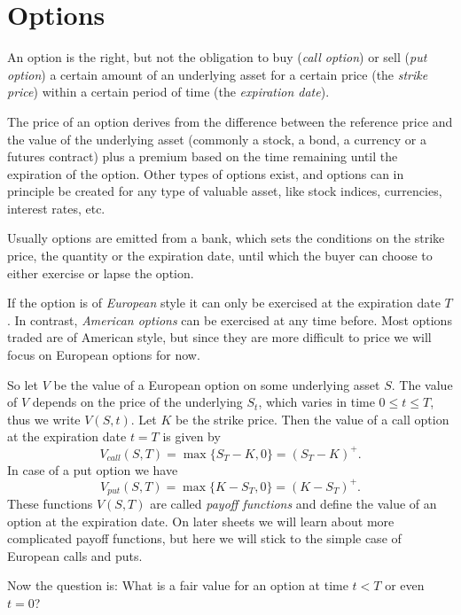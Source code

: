 \documentclass{scrartcl}
\begin{document}
	\section{Options}
	An option is the right, but not the obligation to buy (\textit{call option}) or sell (\textit{put option}) a certain amount of an underlying asset for a certain price (the \textit{strike price}) within a certain period of time (the \textit{expiration date}).\par
	The price of an option derives from the difference between the reference price and the value of the underlying asset (commonly a stock, a bond, a currency or a futures contract) plus a premium based on the time remaining until the expiration of the option. Other types of options exist, and options can in principle be created for any type of valuable asset, like stock indices, currencies, interest rates, etc.\par
	Usually options are emitted from a bank, which sets the conditions on the strike price, the quantity or the expiration date, until which the buyer can choose to either exercise or lapse the option.\par 
	If the option is of \textit{European} style it can only be exercised at the expiration date $T$. In contrast, \textit{American options} can be exercised at any time before. Most options traded are of American style, but since they are more difficult to price we will focus on European options for now.\par 
	So let $V$ be the value of a European option on some underlying asset $S$. The value of $V$ depends on the price of the underlying $S_t$, which varies in time $0\leq t\leq T$, thus we write $V(S,t)$. Let $K$ be the strike price. Then the value of a call option at the expiration date $t=T$ is given by
	\begin{equation}
		V_{call}(S, T) = \max\{S_T - K, 0\} = (S_T - K)^+ \text{.}
	\end{equation}
	In case of a put option we have
	\begin{equation}
		V_{put}(S, T) = \max\{K - S_T, 0\} = (K - S_T)^+ \text{.}
	\end{equation}
	These functions $V(S, T)$ are called \textit{payoff functions} and define the value of an option at the expiration date. On later sheets we will learn about more complicated payoff functions, but here we will stick to the simple case of European calls and puts.\par
	Now the question is: What is a fair value for an option at time $t < T$ or even $t = 0$?
	
\end{document}
